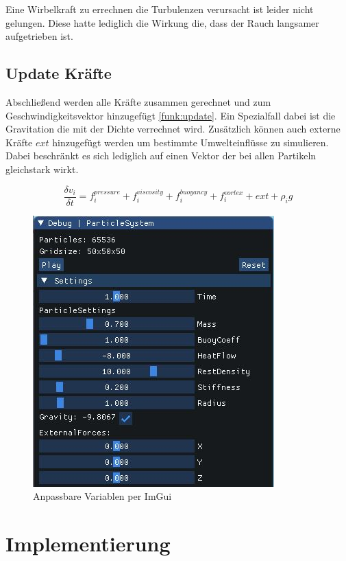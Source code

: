 \documentclass[intern,palatino]{cgBA}
\begin{document}
Eine Wirbelkraft zu errechnen die Turbulenzen verursacht ist leider nicht gelungen. Diese hatte lediglich die Wirkung die, dass der Rauch langsamer aufgetrieben ist. 


\subsection{Update Kräfte}\label{kräfte}

Abschließend werden alle Kräfte zusammen gerechnet und zum Geschwindigkeitsvektor hinzugefügt \ref{funk:update}. Ein Spezialfall dabei ist die Gravitation die mit der Dichte verrechnet wird. Zusätzlich können auch externe Kräfte $ext$ hinzugefügt werden um bestimmte Umwelteinflüsse zu simulieren. Dabei beschränkt es sich lediglich auf einen Vektor der bei allen Partikeln gleichstark wirkt.
\newline

\begin{equation}\label{funk:update}
\frac{\delta v_i}{\delta t}  = f^{pressure}_i + f^{viscosity}_i + f^{buoyancy}_i + f^{vortex}_i + ext + \rho_i g
\end{equation}

\begin{figure}[H]
	\centering
	\includegraphics[width=0.35\columnwidth]{Bilder/external.jpg}
	\caption{Anpassbare Variablen per ImGui}
	\label{img:ext}
\end{figure}
\newpage


\section{Implementierung}\label{imp}
\end{document}

